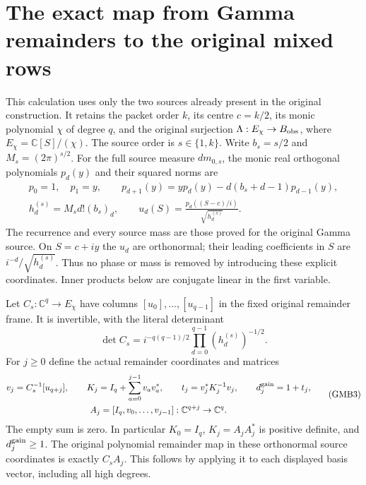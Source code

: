 \documentclass[11pt,a4paper]{article}
\begin{document}

\clearpage

\section{The exact map from Gamma remainders to the original mixed rows}
\label{sec:GMB}

This calculation uses only the two sources already present in the
original construction. It retains the packet order $k$, its centre
$c=k/2$, its monic polynomial $\chi$ of degree $q$, and the original
surjection $\Lambda:E_\chi\to B_{\rm obs}$, where
$E_\chi=\mathbb C[S]/(\chi)$. The source order is $s\in\{1,k\}$.
Write $b_s=s/2$ and $M_s=(2\pi)^{s/2}$. For the full source measure
$dm_{0,s}$, the monic real orthogonal polynomials $p_d(y)$ and their
squared norms are
\[
\begin{gathered}
 p_0=1,\quad p_1=y,\qquad
 p_{d+1}(y)=yp_d(y)-d(b_s+d-1)p_{d-1}(y),\\
 h_d^{(s)}=M_s d!(b_s)_d,\qquad
 u_d(S)=\frac{p_d((S-c)/i)}{\sqrt{h_d^{(s)}}}.
\end{gathered}\tag{GMB1}
\]
The recurrence and every source mass are those proved for the
original Gamma source. On $S=c+iy$ the $u_d$ are orthonormal;
their leading coefficients in $S$ are $i^{-d}/\sqrt{h_d^{(s)}}$.
Thus no phase or mass is removed by introducing these explicit
coordinates. Inner products below are conjugate linear in the
first variable.

Let $C_s:\mathbb C^q\to E_\chi$ have columns
$[u_0],\ldots,[u_{q-1}]$ in the fixed original remainder frame.
It is invertible, with the literal determinant
\[
 \det C_s=i^{-q(q-1)/2}\prod_{d=0}^{q-1}(h_d^{(s)})^{-1/2}.
 \tag{GMB2}
\]
For $j\geq0$ define the actual remainder coordinates and matrices
\[
\begin{gathered}
 v_j=C_s^{-1}[u_{q+j}],\qquad
 K_j=I_q+\sum_{a=0}^{j-1}v_av_a^*,\qquad
 t_j=v_j^*K_j^{-1}v_j,\qquad d_j^{\rm gain}=1+t_j,\\
 A_j=[I_q,v_0,\ldots,v_{j-1}]:\mathbb C^{q+j}\to\mathbb C^q.
\end{gathered}\tag{GMB3}
\]
The empty sum is zero. In particular $K_0=I_q$, $K_j=A_jA_j^*$
is positive definite, and $d_j^{\rm gain}\geq1$.
The original polynomial remainder map in these orthonormal source
coordinates is exactly $C_sA_j$. This follows by applying it to
each displayed basis vector, including all high degrees.
\end{document}
